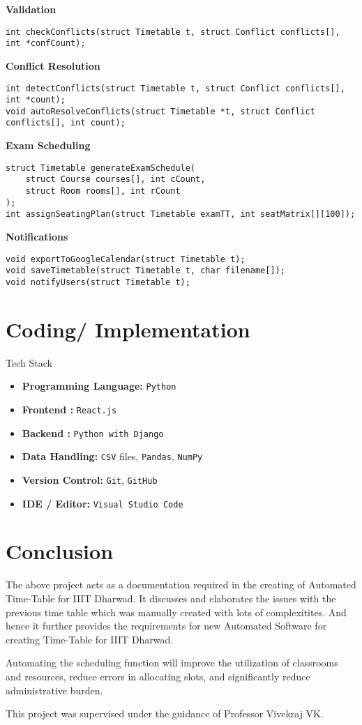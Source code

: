 \documentclass[12pt]{article}
\begin{document}
\noindent\textbf{Validation}
\begin{lstlisting}
int checkConflicts(struct Timetable t, struct Conflict conflicts[], int *confCount);
\end{lstlisting}

\noindent\textbf{Conflict Resolution}
\begin{lstlisting}
int detectConflicts(struct Timetable t, struct Conflict conflicts[], int *count);
void autoResolveConflicts(struct Timetable *t, struct Conflict conflicts[], int count);
\end{lstlisting}

\noindent\textbf{Exam Scheduling}
\begin{lstlisting}
struct Timetable generateExamSchedule(
    struct Course courses[], int cCount,
    struct Room rooms[], int rCount
);
int assignSeatingPlan(struct Timetable examTT, int seatMatrix[][100]);
\end{lstlisting}

\noindent\textbf{Notifications}
\begin{lstlisting}
void exportToGoogleCalendar(struct Timetable t);
void saveTimetable(struct Timetable t, char filename[]);
void notifyUsers(struct Timetable t);
\end{lstlisting}
\section{Coding/ Implementation}
\large Tech Stack

\begin{itemize}
    \item \textbf{Programming Language:} \texttt{Python}
    \item \textbf{Frontend :} \texttt{React.js}
    \item \textbf{Backend :} \texttt{Python with Django}
    \item \textbf{Data Handling:} \texttt{CSV} files, \texttt{Pandas}, \texttt{NumPy}
    \item \textbf{Version Control:} \texttt{Git}, \texttt{GitHub}
    \item \textbf{IDE / Editor:} \texttt{Visual Studio Code}
\end{itemize}


\newpage
\section{Conclusion}
\par \large The above project acts as a documentation required in the creating of Automated Time-Table for IIIT Dharwad. It discusses and elaborates the issues with the previous time table which was manually created with lots of complexitites. And hence it further provides the requirements for new Automated Software for creating Time-Table for IIIT Dharwad.
\par \large Automating the scheduling function will improve the utilization of classrooms and resources, reduce errors in allocating slots, and significantly reduce administrative burden.
\par \large This project was supervised under the guidance of Professor Vivekraj VK.
\newpage
\end{document}
